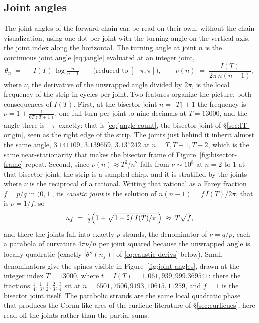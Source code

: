 \documentclass[11pt]{article}
\theoremstyle{definition}
\begin{document}
\subsection{Joint angles}\label{sec:joint-angles}

The joint angles of the forward chain can be read on their own, without the
chain visualization, using one dot per joint with
the turning angle on the vertical axis, the joint index along the horizontal.
The turning angle at joint $n$ is the continuous joint angle \eqref{eq:jangle}
evaluated at an integer joint,
\begin{equation}\label{eq:theta-joint}
\theta_n \;=\; -I(T)\,\log\tfrac{n}{n-1}
\qquad\text{(reduced to $[-\pi,\pi]$)},
\qquad
\nu(n) \;=\; \frac{I(T)}{2\pi\,n(n-1)},
\end{equation}
where $\nu$, the derivative of
the unwrapped angle divided by $2\pi$, is the local frequency of the strip in
cycles per joint. Two features organize the picture, both consequences of
$I(T)$. First, at the bisector joint $n=\lfloor T\rfloor+1$ the frequency is
$\nu=1+\frac{1}{6T(T+1)}$, one full turn per joint to nine decimals at
$T=13000$, and the angle there is $-\pi$ exactly: that is
\eqref{eq:jangle-count}, the bisector joint of \S\ref{sec:IT-origin}, seen as the right
edge of the strip. The joints just behind it inherit almost the same angle,
$3.141109$, $3.139659$, $3.137242$ at $n=T,T-1,T-2$, which is the same
near-stationarity that makes the bisector frame of
Figure~\ref{fig:bisector-frame} repeat. Second, since
$\nu(n)\approx T^{2}/n^{2}$ falls from $\nu\sim10^{8}$ at $n=2$ to $1$ at that
bisector joint, the strip is a sampled chirp, and it is stratified by the joints where
$\nu$ is the reciprocal of a rational. Writing that rational as a Farey
fraction $f=p/q$ in $(0,1]$, its \emph{caustic joint} is the solution of
$n(n-1)=f\,I(T)/2\pi$, that is $\nu=1/f$, so
\begin{equation}\label{eq:caustic-joint}
n_{f}\;=\;\tfrac12\Bigl(1+\sqrt{1+2f\,I(T)/\pi}\,\Bigr)\;\approx\;T\sqrt{f},
\end{equation}
and there the joints fall into exactly $p$ strands, the denominator of
$\nu=q/p$, each a parabola of curvature $4\pi\nu/n$ per joint squared because
the unwrapped angle is locally quadratic (exactly
$|\widetilde\theta''(n_f)|$ of \eqref{eq:caustic-derivs} below). Small denominators give the spines
visible in Figure~\ref{fig:joint-angles}, drawn at the integer index $T=13000$,
where $t=I(T)=1{,}061{,}939{,}999.369541$: there the fractions
$\tfrac14,\tfrac13,\tfrac12,\tfrac23,\tfrac34$ sit at
$n=6501,7506,9193,10615,11259$, and $f=1$ is the bisector joint itself. The parabolic
strands are the same local quadratic phase that produces the Cornu-like arcs of
the curlicue literature of \S\ref{sec:curlicues}, here read off the joints
rather than the partial sums.
\end{document}
